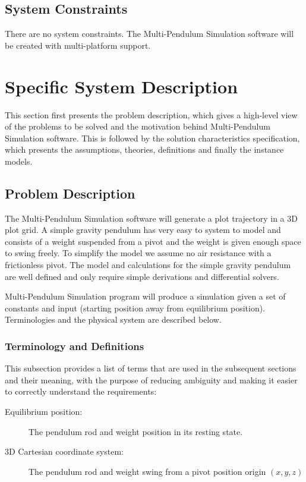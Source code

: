 \documentclass[12pt]{article}
\newcommand{\progname}{Multi-Pendulum Simulation }
\begin{document}
\subsection{System Constraints}
There are no system constraints. The \progname software will be created with
multi-platform support.

\newpage
\section{Specific System Description}

This section first presents the problem description, which gives a high-level
view of the problems to be solved and the motivation behind \progname software.
This is followed by the solution
characteristics specification, which presents the assumptions, theories, 
definitions and finally the instance models.

\subsection{Problem Description}

The \progname software will generate a plot trajectory in a 3D plot grid.
A simple gravity pendulum has very easy to system to model and consists of a
weight suspended from a pivot and the weight is given enough space to swing
freely. To simplify the model we assume no air resistance with a frictionless
pivot. The model and calculations for the simple gravity pendulum are well
defined and only require simple derivations and differential solvers.

\progname program will produce a simulation given a set of constants and input 
(starting position away from equilibrium position).
Terminologies and the physical system are described below.

\subsubsection{Terminology and Definitions}

This subsection provides a list of terms that are used in the subsequent
sections and their meaning, with the purpose of reducing ambiguity and making
it easier to correctly understand the requirements:

\begin{description}
\item[Equilibrium position:] The pendulum rod and weight position in its resting state.
\item[3D Cartesian coordinate system:] The pendulum rod and weight swing from a
pivot position origin $(x,y,z)$
\end{description}
\end{document}

